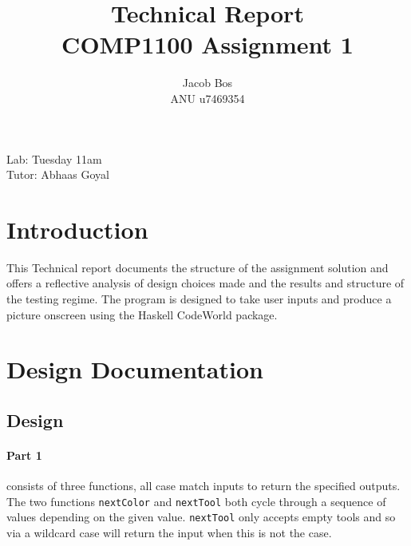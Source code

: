 \documentclass[11pt]{article}
\title{Technical Report\\ COMP1100 Assignment 1}
\author{Jacob Bos\\ ANU u7469354}
\begin{document}
\maketitle
{}
\begin{center}
  Lab: Tuesday 11am\\
  Tutor: Abhaas Goyal
\end{center}
\tableofcontents
\newpage
{}
\section{Introduction} 
This Technical report documents the structure of the assignment solution and offers a reflective analysis of design choices made and the results and structure of the testing regime. The program is designed to take user inputs and produce a picture onscreen using the Haskell CodeWorld package. %


\section{Design Documentation}%
\subsection{Design}
\paragraph{Part 1} consists of three functions, all case match inputs to return the specified outputs. The two functions \verb|nextColor| and  \verb|nextTool| both cycle through a sequence of values depending on the given value.  \verb|nextTool| only accepts empty tools and so via a wildcard case will return the input when this is not the case. %
\end{document}
